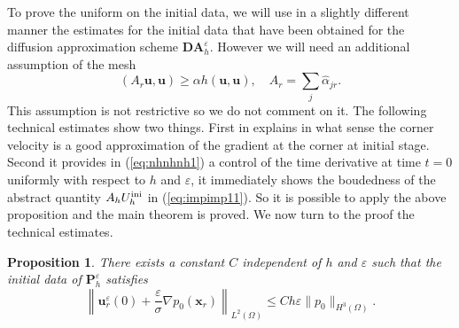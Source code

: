 \documentclass[a4paper,french,english,10pt]{article}
\newcommand\uu{\mathbf{u}}
\newcommand\eps{\varepsilon}
\newcommand\alj{\widehat{\alpha}_{jr}}
\newtheorem{proposition}[theorem]{Proposition}
\begin{document}
To prove the uniform on the initial data, we will use in a slightly different manner
the estimates for the initial data that have been obtained for the diffusion approximation
scheme $\mathbf{DA}_h^\eps$.
However we will need an additional assumption of the mesh 
 \begin{equation}\label{geom4.r}
(A_r\uu, \uu)\geq \alpha h (\uu,\uu), \quad A_r=\sum_j\alj.
\end{equation}
This assumption is not restrictive so we do not comment on it.
The following  technical estimates show two things.
First in explains in what sense the corner velocity  is a good approximation
of the gradient at the corner at initial stage.
Second it provides in (\ref{eq:nhnhnh1}) a control of the time derivative at time $t=0$
 uniformly 
with respect to $h$ and $\eps$, 
it 
immediately shows the boudedness of the abstract quantity $A_h U_h^{\rm ini}$ in (\ref{eq:impimp11}).
So it is possible to apply the above proposition and the main theorem is proved.
We now turn to the proof the technical estimates.

\begin{proposition}
There exists a constant $C$ independent of $h$ and $\varepsilon$ such that the initial data
of $\mathbf P_h^\eps$ satisfies
\begin{equation} \label{eq:urur}
\left\|  \mathbf u_r^\eps(0) + \frac\varepsilon \sigma \nabla p_0(\mathbf x_r) \right\|_{L^2(\Omega)}
\leq Ch \varepsilon \|  p_0 \|_{H^3(\Omega)}.
\end{equation}
\end{proposition}
\end{document}
